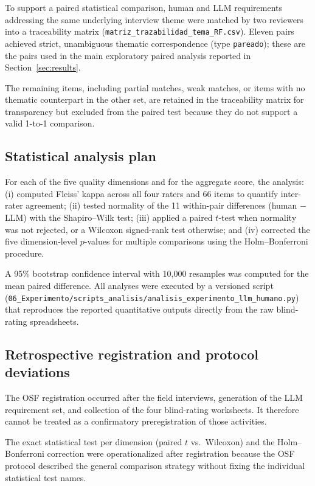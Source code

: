 \documentclass[pdflatex,sn-basic]{sn-jnl}
\begin{document}
To support a paired statistical comparison, human and LLM requirements addressing the same underlying interview theme were matched by two reviewers into a traceability matrix (\texttt{matriz\_trazabilidad\_tema\_RF.csv}). Eleven pairs achieved strict, unambiguous thematic correspondence (type \texttt{pareado}); these are the pairs used in the main exploratory paired analysis reported in Section~\ref{sec:results}.

The remaining items, including partial matches, weak matches, or items with no thematic counterpart in the other set, are retained in the traceability matrix for transparency but excluded from the paired test because they do not support a valid 1-to-1 comparison.

\subsection{Statistical analysis plan}

For each of the five quality dimensions and for the aggregate score, the analysis: (i) computed Fleiss' kappa across all four raters and 66 items to quantify inter-rater agreement; (ii) tested normality of the 11 within-pair differences (human $-$ LLM) with the Shapiro--Wilk test; (iii) applied a paired $t$-test when normality was not rejected, or a Wilcoxon signed-rank test otherwise; and (iv) corrected the five dimension-level $p$-values for multiple comparisons using the Holm--Bonferroni procedure.

A 95\% bootstrap confidence interval with 10{,}000 resamples was computed for the mean paired difference. All analyses were executed by a versioned script (\texttt{06\_Experimento/scripts\_analisis/analisis\_experimento\_llm\_humano.py}) that reproduces the reported quantitative outputs directly from the raw blind-rating spreadsheets.

\subsection{Retrospective registration and protocol deviations}

The OSF registration occurred after the field interviews, generation of the LLM requirement set, and collection of the four blind-rating worksheets. It therefore cannot be treated as a confirmatory preregistration of those activities.

The exact statistical test per dimension (paired $t$ vs.\ Wilcoxon) and the Holm--Bonferroni correction were operationalized after registration because the OSF protocol described the general comparison strategy without fixing the individual statistical test names.
\end{document}
